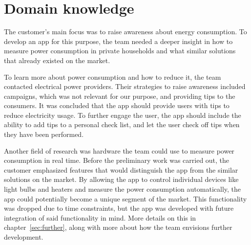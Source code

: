 \section{Domain knowledge}
The customer's main focus was to raise awareness about energy consumption. To develop an app for this purpose, the team needed a deeper insight in how to measure power consumption in private households and what similar solutions that already existed on the market.

To learn more about power consumption and how to reduce it, the team contacted electrical power providers. Their strategies to raise awareness included campaigns, which was not relevant for our purpose, and providing tips to the consumers. It was concluded that the app should provide users with tips to reduce electricity usage. To further engage the user, the app should include the ability to add tips to a personal check list, and let the user check off tips when they have been performed.

Another field of research was hardware the team could use to measure power consumption in real time. Before the preliminary work was carried out, the customer emphasized features that would distinguish the app from the similar solutions on the market. By allowing the app to control individual devices like light bulbs and heaters and measure the power consumption automatically, the app could potentially become a unique segment of the market. This functionality was dropped due to time constraints, but the app was developed with future integration of said functionality in mind. More details on this in chapter~\ref{sec:further}, along with more about how the team envisions further development.

